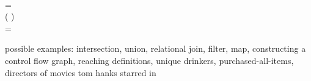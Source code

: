 \begin{code}
   \isa {}\\
   =
  \\[\betweenfunctionskip]
   \isa \iso( \x {}) \to \tbool\\
   \< =
\end{code}

\noindent
possible examples: intersection, union, relational join, filter, map, constructing a control flow graph, reaching definitions, unique drinkers, purchased-all-items, directors of movies tom hanks starred in

